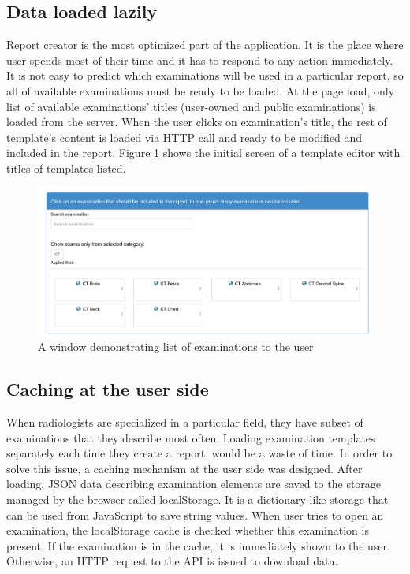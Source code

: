 \documentclass[12pt, twoside, openany]{report}
\theoremstyle{definition}
\begin{document}
\subsection{Data loaded lazily}
Report creator is the most optimized part of the application. It is the place where user spends most of their time and it has to respond to any action immediately. It is not easy to predict which examinations will be used in a particular report, so all of available examinations must be ready to be loaded. At the page load, only list of available examinations' titles (user-owned and public examinations) is loaded from the server. When the user clicks on examination's title, the rest of template's content is loaded via HTTP call and ready to be modified and included in the report. Figure \ref{fig:examination-list} shows the initial screen of a template editor with titles of templates listed.
\begin{figure}
	\centering
	\includegraphics[width=\linewidth]{examination-list}
	\caption{A window demonstrating list of examinations to the user\protect\footnotemark
		\label{fig:examination-list}
	}
\end{figure}



\subsection{Caching at the user side}
When radiologists are specialized in a particular field, they have subset of examinations that they describe most often. Loading examination templates separately each time they create a report, would be a waste of time. In order to solve this issue, a caching mechanism at the user side was designed. After loading, JSON data describing examination elements are saved to the storage managed by the browser called localStorage. It is a dictionary-like storage that can be used from JavaScript to save string values. When user tries to open an examination, the localStorage cache is checked whether this examination is present. If the examination is in the cache, it is immediately shown to the user. Otherwise, an HTTP request to the API is issued to download data.
\end{document}
